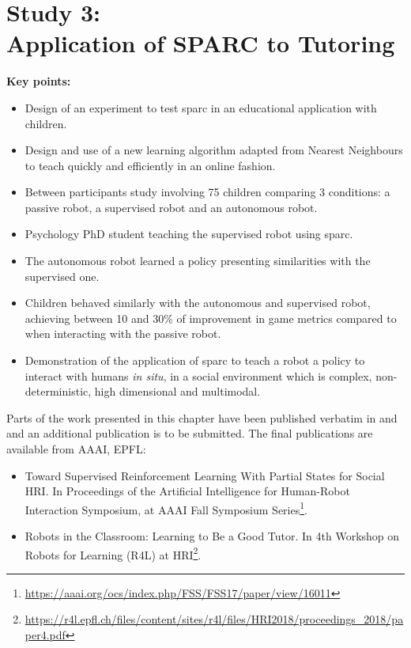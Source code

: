 \chapter[Study 3: Application of SPARC to Tutoring]{Study 3: \\Application of SPARC to Tutoring}\label{chap:tutoring}
\glsresetall
\graphicspath{{images/tutoring/}}

\newcommand{\QI}{by receiving supervision from a human teacher, a robot can learn while only displaying an appropriate behaviour}
\newcommand{\QII}{after learning, such a robot would be able to interact autonomously and efficiently with humans}

\begin{framed}
	\textbf{Key points:}
	
	\begin{itemize}
		\item Design of an experiment to test \acrshort{sparc} in an educational application with children.
		\item Design and use of a new learning algorithm adapted from Nearest Neighbours to teach quickly and efficiently in an online fashion.
		\item Between participants study involving 75 children comparing 3 conditions: a passive robot, a supervised robot and an autonomous robot.
		\item Psychology PhD student teaching the supervised robot using \acrshort{sparc}.
		\item The autonomous robot learned a policy presenting similarities with the supervised one.
		\item Children behaved similarly with the autonomous and supervised robot, achieving between 10 and 30\% of improvement in game metrics compared to when interacting with the passive robot.
		\item Demonstration of the application of \acrshort{sparc} to teach a robot a policy to interact with humans \emph{in situ}, in a social environment which is complex, non-deterministic, high dimensional and multimodal.
	\end{itemize}
\end{framed}

Parts of the work presented in this chapter have been published verbatim in \cite{senft2017toward} and \cite{senft2018robots} and an additional publication is to be submitted. The final publications are available from AAAI, EPFL:
\begin{itemize}
	\item Toward Supervised
	Reinforcement Learning With Partial States for Social HRI. In Proceedings of the Artificial Intelligence for Human-Robot Interaction Symposium, at AAAI Fall Symposium Series\footnote{\url{https://aaai.org/ocs/index.php/FSS/FSS17/paper/view/16011}}.
	\item Robots in the Classroom: Learning to Be a Good Tutor. In 4th Workshop on Robots for Learning (R4L) at HRI\footnote{\url{https://r4l.epfl.ch/files/content/sites/r4l/files/HRI2018/proceedings_2018/paper4.pdf}}.
\end{itemize} 

